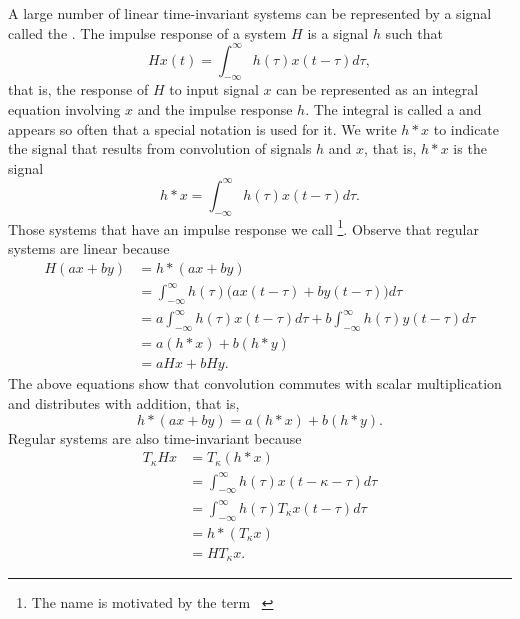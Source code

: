 A large number of linear time-invariant systems can be represented by a signal called the .  The impulse response of a system $H$ is a signal $h$ such that
\[
Hx(t) = \int_{-\infty}^{\infty} h(\tau) x(t - \tau) d\tau,
\]
that is, the response of $H$ to input signal $x$ can be represented as an integral equation involving $x$ and the impulse response $h$.  The integral is called a  and appears so often that a special notation is used for it.  We write $h * x$ to  indicate the signal that results from convolution of signals $h$ and $x$, that is, $h * x$ is the signal
\[
h * x = \int_{-\infty}^{\infty} h(\tau) x(t - \tau) d\tau.
\]
Those systems that have an impulse response we call \footnote{The name  is motivated by the term ~\citep{Zemanian_dist_theory_1965}}.  Observe that regular systems are linear because
\begin{equation}\begin{split}\label{eq:regsystemislinear}
H(ax + by) &= h * (ax + by) \\
&= \int_{-\infty}^{\infty} h(\tau) \big(ax(t - \tau) + by(t - \tau)\big) d\tau \\
&= a\int_{-\infty}^{\infty} h(\tau) x(t - \tau) d\tau + b\int_{-\infty}^{\infty} h(\tau)y(t - \tau) d\tau \\
&= a (h * x) + b(h*y) \\
&= a Hx + bHy.
\end{split}\end{equation}
The above equations show that convolution commutes with scalar multiplication and distributes with addition, that is,
\[
h * (ax + by) =  a (h * x) + b(h*y).
\]
Regular systems are also time-invariant because
\begin{align*}
T_\kappa H x &= T_\kappa(h * x ) \\
&= \int_{-\infty}^{\infty} h(\tau) x(t- \kappa - \tau) d\tau \\
&= \int_{-\infty}^{\infty} h(\tau) T_\kappa x(t - \tau) d\tau \\ 
&= h * (T_\kappa x) \\
&= H T_\kappa x. 
\end{align*}

